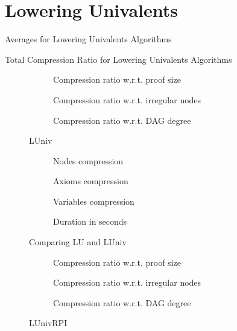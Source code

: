 \section{Lowering Univalents}
\begin{table}[hbt]
  \centering
  \caption{Averages for Lowering Univalents Algorithms}
\end{table}
\begin{table}[hbt]
  \centering
  \caption{Total Compression Ratio for Lowering Univalents Algorithms}
\end{table}
\begin{figure}[hbt]
  \begin{subfigure}{\textwidth}
    \centering
    \caption{Compression ratio w.r.t. proof size}
  \end{subfigure}
  \begin{subfigure}{\textwidth}
    \centering
    \caption{Compression ratio w.r.t. irregular nodes}
  \end{subfigure}
  \begin{subfigure}{\textwidth}
    \centering
    \caption{Compression ratio w.r.t. DAG degree}
  \end{subfigure}
  \caption{LUniv}
\end{figure}
\begin{figure}[hbt]
  \begin{subfigure}{0.5\textwidth}
    \centering
    \caption{Nodes compression}
  \end{subfigure}
  \begin{subfigure}{0.5\textwidth}
    \centering
    \caption{Axioms compression}
  \end{subfigure}
  \begin{subfigure}{0.5\textwidth}
    \centering
    \caption{Variables compression}
  \end{subfigure}
  \begin{subfigure}{0.5\textwidth}
    \centering
    \caption{Duration in seconds}
  \end{subfigure}
  \caption{Comparing LU and LUniv}
\end{figure}
\begin{figure}[hbt]
  \begin{subfigure}{\textwidth}
    \centering
    \caption{Compression ratio w.r.t. proof size}
  \end{subfigure}
  \begin{subfigure}{\textwidth}
    \centering
    \caption{Compression ratio w.r.t. irregular nodes}
  \end{subfigure}
  \begin{subfigure}{\textwidth}
    \centering
    \caption{Compression ratio w.r.t. DAG degree}
  \end{subfigure}
  \caption{LUnivRPI}
\end{figure}
